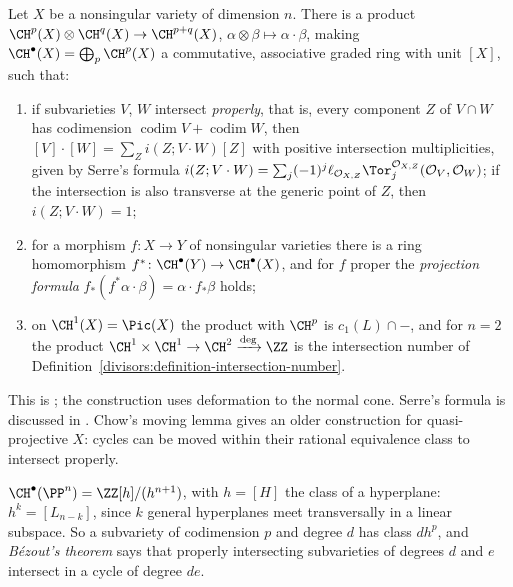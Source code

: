 \begin{theorem}\label{intersection-theory:theorem-intersection-ring}
Let $X$ be a nonsingular variety of dimension $n$. There is a product $\CH^p(X) \otimes \CH^q(X) \to \CH^{p+q}(X)$, $\alpha \otimes \beta \mapsto \alpha \cdot \beta$, making
$\CH^\bullet(X) = \bigoplus_p\CH^p(X)$ a commutative, associative graded ring with unit $[X]$, such that:
\begin{enumerate}
\item if subvarieties $V$, $W$ intersect \emph{properly}, that is, every component $Z$ of $V \cap W$ has codimension $\operatorname{codim}V + \operatorname{codim}W$, then
$[V] \cdot [W] = \sum_Zi(Z; V \cdot W)[Z]$ with positive intersection multiplicities, given by Serre's formula
$i(Z; V \cdot W) = \sum_j(-1)^j\ell_{\mathcal{O}_{X,Z}}\Tor_j^{\mathcal{O}_{X,Z}}(\mathcal{O}_V, \mathcal{O}_W)$; if the intersection is also transverse at the generic point of $Z$, then $i(Z; V \cdot W) = 1$;
\item for a morphism $f \colon X \to Y$ of nonsingular varieties there is a ring homomorphism $f^* \colon \CH^\bullet(Y) \to \CH^\bullet(X)$, and for $f$ proper the
\emph{projection formula} $f_*(f^*\alpha \cdot \beta) = \alpha \cdot f_*\beta$ holds;
\item on $\CH^1(X) = \Pic(X)$ the product with $\CH^p$ is $c_1(L) \cap -$, and for $n = 2$ the product $\CH^1 \times \CH^1 \to \CH^2 \xrightarrow{\deg} \ZZ$ is the intersection
number of Definition~\ref{divisors:definition-intersection-number}.
\end{enumerate}
\end{theorem}

This is \cite[Chapters 6--8]{fulton-intersection}; the construction uses deformation to the normal cone. Serre's formula is discussed in \cite[Chapter 7]{fulton-intersection}.
Chow's moving lemma gives an older construction for quasi-projective $X$: cycles can be moved within their rational equivalence class to intersect properly.

\begin{example}\label{intersection-theory:example-chow-ring-projective}
$\CH^\bullet(\PP^n) = \ZZ[h]/(h^{n+1})$, with $h = [H]$ the class of a hyperplane: $h^k = [L_{n-k}]$, since $k$ general hyperplanes meet transversally in a linear subspace. So a subvariety of
codimension $p$ and degree $d$ has class $dh^p$, and \emph{B\'ezout's theorem} says that properly intersecting subvarieties of degrees $d$ and $e$ intersect in a cycle of degree $de$.
\end{example}

